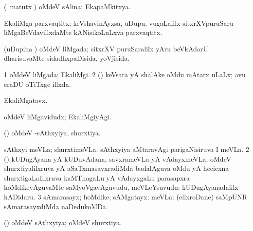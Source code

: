 {{\bentry
{} 
\gl{\gu}
\expl{}
\bmng
(\savi\ matutx \pArxvi) oMdeV sAlina; EkapaMkitxya. 
\emng
\eentry

\bentry
{} 
\gl{\nA}
\expl{}
\bmng
EkaliMga parxvaqtitx; keVshavinAyxsa, uDupu, \mo vugaLalilx sitxrXVpuruSaru liMgaBeVdavillxdaMte kANisikoLuLxva parxvaqtitx. 
\emng
\eentry

\bentry
{} 
\gl{\gu}
\expl{}
\bmng
(uDupina \vi) oMdeV liMgada; sitxrXV puruSaralilx yAru beVkAdarU dharisuvaMte sidadhxpaDisida, yoVjisida. 
\emng
\eentry

\bentry
{} 
\gl{\gu}
\expl{}
\bmng
\bnum
\num{1} oMdeV liMgada; EkaliMgi. 
\num{2} (\savi) keVsara yA shalAke oMdu mAtarx uLaLx; avu eraDU oTiTxge illxda. 
\enum
\emng
\eentry

\bentry
{} 
\gl{\nA}
\expl{}
\bmng
EkaliMgatavx. 
\emng
\eentry

\bentry
{} 
\gl{\kirxvi}
\expl{}
\bmng
oMdeV liMgavidudx; EkaliMgiyAgi. 
\emng
\eentry

\bentry
{} 
\gl{\gu}
\expl{}
\bmng
(\saM) oMdeV -sAthxyiya, shurxtiya. 
\emng
\eentry

\bentry
{} 
\gl{\nA}
\expl{}
\bmng
\bnum
{} 
\banum
{} sAthxyi meVLa; shurxtimeVLa. 
 sAthxyiya aMtaravAgi parigaNisiruva I meVLa. 
\eanum
\numie
\num{2} (\saM) kUDugAyana yA kUDuvAdana; savxrameVLa yA vAdayxmeVLa; oMdeV shurxtiyalilxruva yA aSaTxmasavxradiMda badalAguva oMdu yA hecicxna shurxtigaLalilxruva kaMThagaLu yA vAdayxgaLu parasapxra hoMdikeyAguvaMte saMyoVgavAguvudu, meVLeYsuvudu:  kUDugAyanadalilx hADidaru. 
\num{3} sAmarasayx; hoMdike; sAMgatayx; meVLa:  (ellxroDane) saMpUNR sAmarasayxdiMda naDedukoMDa. 
\enum
\emng
\eentry

\bentry
{} 
\gl{\gu}
\expl{}
\bmng
(\saM) oMdeV sAthxyiya; oMdeV shurxtiya. 
\emng
\eentry

\bentry
{} 
\gl{\gu}
\expl{}
\bmng
{} 
\emng
\eentry

\bentry
{} 
\gl{\gu}
\expl{}
\bmng
{} 
\emng
\eentry

}}
